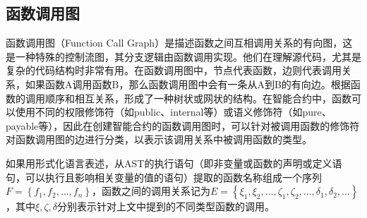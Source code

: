 \subsection{函数调用图}
\label{sec:函数调用图}
函数调用图（Function Call Graph）是描述函数之间互相调用关系的有向图，这是一种特殊的控制流图，其分支逻辑由函数调用实现。他们在理解源代码，尤其是复杂的代码结构时非常有用。在函数调用图中，节点代表函数，边则代表调用关系，如果函数A调用函数B，那么函数调用图中会有一条从A到B的有向边。根据函数的调用顺序和相互关系，形成了一种树状或网状的结构。在智能合约中，函数可以使用不同的权限修饰符（如public、internal等）或语义修饰符（如pure、payable等），因此在创建智能合约的函数调用图时，可以针对被调用函数的修饰符对函数调用图的边进行分类，以表示该调用关系中被调用函数的类型。

如果用形式化语言表述，从AST的执行语句（即非变量或函数的声明或定义语句，可以执行且影响相关变量的值的语句）提取的函数名称组成一个序列$F=\left\{f_1, f_2, \ldots, f_n\right\}$，函数之间的调用关系记为$E=\left\{\xi_1, \xi_2, \ldots, \zeta_1, \zeta_2, \ldots, \delta_1, \delta_2, \ldots\right\}$，其中$\xi, \zeta, \delta$分别表示针对上文中提到的不同类型函数的调用。%


